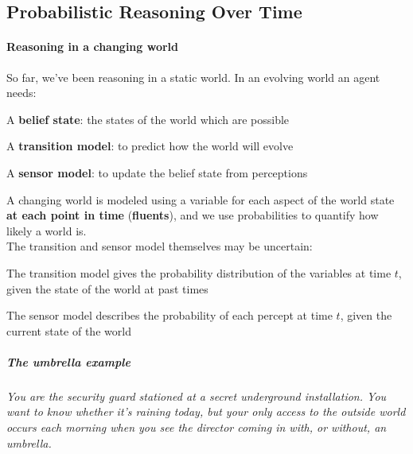 \documentclass[10pt]{report}
\begin{document}
\subsection{Probabilistic Reasoning Over Time}
\paragraph{Reasoning in a changing world} So far, we've been reasoning in a static world. In an evolving world an agent needs:
\begin{list}{}{}
	\item A \textbf{belief state}: the states of the world which are possible
	\item A \textbf{transition model}: to predict how the world will evolve
	\item A \textbf{sensor model}: to update the belief state from perceptions
\end{list}
A changing world is modeled using a variable for each aspect of the world state \textbf{at each point in time} (\textbf{fluents}), and we use probabilities to quantify how likely a world is.\\
The transition and sensor model themselves may be uncertain:
\begin{list}{}{}
	\item The transition model gives the probability distribution of the variables at time $t$, given the state of the world at past times
	\item The sensor model describes the probability of each percept at time $t$, given the current state of the world
\end{list}
\subparagraph{The umbrella example} \textit{You are the security guard stationed at a secret underground installation. You want to know whether it's raining today, but your only access to the outside world occurs each morning when you see the director coming in with, or without, an umbrella.}
\end{document}
